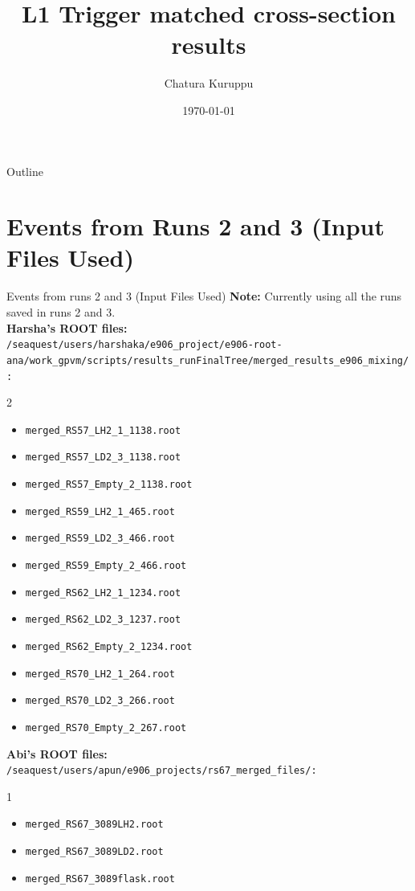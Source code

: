 \documentclass[aspectratio=169, 10pt]{beamer}
\title[DY Absolute Cross-Section]{L1 Trigger matched cross-section results}
\author[C. Kuruppu]{Chatura Kuruppu}
\institute[NMSU]{New Mexico State University}
\date{\today}
\begin{document}
\begin{frame}
    \titlepage
\end{frame}

\begin{frame}{Outline}
    \tableofcontents[hideallsubsections]
\end{frame}

\section{Events from Runs 2 and 3 (Input Files Used)}

\begin{frame}{Events from runs 2 and 3 (Input Files Used)}
\textbf{Note:} Currently using all the runs saved in runs 2 and 3.
\vspace{0.3cm}
\tiny\\
\textbf{Harsha's ROOT files:} \\
\texttt{/seaquest/users/harshaka/e906\_project/e906-root-ana/work\_gpvm/scripts/results\_runFinalTree/merged\_results\_e906\_mixing/:}
\begin{multicols}{2}
\begin{itemize}
    \item \texttt{merged\_RS57\_LH2\_1\_1138.root}
    \item \texttt{merged\_RS57\_LD2\_3\_1138.root}
    \item \texttt{merged\_RS57\_Empty\_2\_1138.root}
    \item \texttt{merged\_RS59\_LH2\_1\_465.root}
    \item \texttt{merged\_RS59\_LD2\_3\_466.root}
    \item \texttt{merged\_RS59\_Empty\_2\_466.root}
    \item \texttt{merged\_RS62\_LH2\_1\_1234.root}
    \item \texttt{merged\_RS62\_LD2\_3\_1237.root}
    \item \texttt{merged\_RS62\_Empty\_2\_1234.root}
    \item \texttt{merged\_RS70\_LH2\_1\_264.root}
    \item \texttt{merged\_RS70\_LD2\_3\_266.root}
    \item \texttt{merged\_RS70\_Empty\_2\_267.root}
\end{itemize}
\end{multicols}
\textbf{Abi's ROOT files:} \\
\texttt{/seaquest/users/apun/e906\_projects/rs67\_merged\_files/:}
\begin{multicols}{1}
\begin{itemize}
    \item \texttt{merged\_RS67\_3089LH2.root}
    \item \texttt{merged\_RS67\_3089LD2.root}
    \item \texttt{merged\_RS67\_3089flask.root}
\end{itemize}
\end{multicols}

\normalsize
\end{frame}
\end{document}
